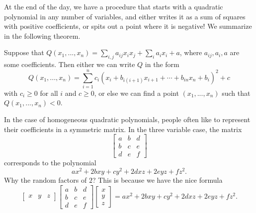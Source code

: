 \documentclass[letterpaper,11pt]{article}
\begin{document}
At the end of the day, we have a procedure that starts with a quadratic polynomial in any number of variables, and either writes it as a sum of squares with positive coefficients, or spits out a point where it is negative! We summarize in the following theorem.

\begin{thm} Suppose that $Q(x_1, ..., x_n) = \sum_{i,j} a_{ij} x_ix_j + \sum_i a_ix_i + a$, where $a_{ij}, a_i, a$ are some coefficients. Then either we can write $Q$ in the form
\[
Q(x_1, ..., x_n) = \sum_{i=1}^n c_i(x_i + b_{i(i+1)}x_{i+1} + \cdots + b_{in}x_n + b_i)^2 + c
\]
with $c_i \ge 0$ for all $i$ and $c \ge 0$, or else we can find a point $(x_1, ..., x_n)$ such that $Q(x_1, ..., x_n) < 0$.
\end{thm}

In the case of homogeneous quadratic polynomials, people often like to represent their coefficients in a symmetric matrix. In the three variable case, the matrix
\[
\begin{bmatrix} a & b & d\\
b & c & e\\
d & e & f
\end{bmatrix}
\]
corresponds to the polynomial
\[
ax^2 + 2bxy + cy^2 + 2dxz + 2eyz + fz^2.
\]
Why the random factors of $2$? This is because we have the nice formula
\[
\begin{bmatrix} x & y & z \end{bmatrix} \begin{bmatrix} a & b & d\\ b & c & e\\ d & e & f \end{bmatrix} \begin{bmatrix} x\\ y\\ z\end{bmatrix} = ax^2 + 2bxy + cy^2 + 2dxz + 2eyz + fz^2.
\]
\end{document}
